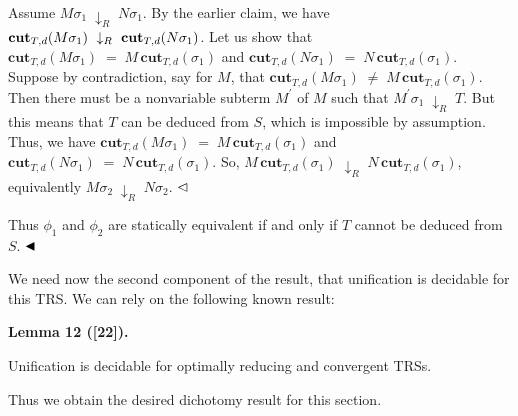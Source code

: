 Assume $M\sigma_{1}\;\downarrow_{R}\;N\sigma_{1}$. By the earlier claim, we have $\mathbf{cut}_{T,d}(M\sigma_{1})\leavevmode\nobreak\ \downarrow_{R}\leavevmode%
\nobreak\ \mathbf{cut}_{T,d}(N\sigma_{1})$. Let us show that $\mathbf{cut}_{T,d}(M\sigma_{1})\;=\;M\,\textbf{cut}_{T,d}(\sigma_{1})$ and $\mathbf{cut}_{T,d}(N\sigma_{1})\;=\;N\,\textbf{cut}_{T,d}(\sigma_{1})$. Suppose by contradiction, say for $M$, that $\mathbf{cut}_{T,d}(M\sigma_{1})\;\neq\;M\,\textbf{cut}_{T,d}(\sigma_{1})$. Then there must be a nonvariable subterm $M^{\prime}$ of $M$ such that $M^{\prime}\sigma_{1}\;\downarrow_{R}\;T$. But this means that $T$ can be deduced from $S$, which is impossible by assumption. Thus, we have $\mathbf{cut}_{T,d}(M\sigma_{1})\;=\;M\,\textbf{cut}_{T,d}(\sigma_{1})$ and $\mathbf{cut}_{T,d}(N\sigma_{1})\;=\;N\,\textbf{cut}_{T,d}(\sigma_{1})$. So, $M\,\textbf{cut}_{T,d}(\sigma_{1})\;\downarrow_{R}\;N\,\textbf{cut}_{T,d}(%
\sigma_{1})$, equivalently $M\sigma_{2}\;\downarrow_{R}\;N\sigma_{2}$. $\hfill\vartriangleleft$\par
 
 
 
Thus $\phi_{1}$ and $\phi_{2}$ are statically equivalent if and only if $T$ cannot be deduced from $S$. $\hfill\blacktriangleleft$\par
 
 
 
We need now the second component of the result, that unification is decidable for this TRS. We can rely on the following known result:\par
 
 
 
\par\medskip\noindent\textbf{Lemma 12 ([22]).}\par
 
 
Unification is decidable for optimally reducing and convergent TRSs.\par
 
 
 
 
Thus we obtain the desired dichotomy result for this section.\par
 
